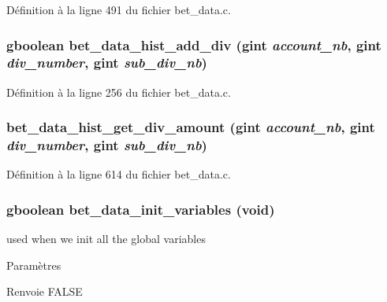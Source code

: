 Définition à la ligne 491 du fichier bet\_\-data.c.

\subsubsection[{bet\_\-data\_\-hist\_\-add\_\-div}]{\setlength{\rightskip}{0pt plus 5cm}gboolean bet\_\-data\_\-hist\_\-add\_\-div (gint {\em account\_\-nb}, \/  gint {\em div\_\-number}, \/  gint {\em sub\_\-div\_\-nb})}\label{bet__data_8h_a8e4e124545cf8a530c9c3ad879bcf5ea}


Définition à la ligne 256 du fichier bet\_\-data.c.

\subsubsection[{bet\_\-data\_\-hist\_\-get\_\-div\_\-amount}]{ bet\_\-data\_\-hist\_\-get\_\-div\_\-amount (gint {\em account\_\-nb}, \/  gint {\em div\_\-number}, \/  gint {\em sub\_\-div\_\-nb})}\label{bet__data_8h_aa0afee08549af46994f0cd802d462338}


Définition à la ligne 614 du fichier bet\_\-data.c.

\subsubsection[{bet\_\-data\_\-init\_\-variables}]{\setlength{\rightskip}{0pt plus 5cm}gboolean bet\_\-data\_\-init\_\-variables (void)}\label{bet__data_8h_ac36863d207e1ef101c501a31760e67a1}
used when we init all the global variables


\begin{DoxyParams}{Paramètres}
\item[{\em }]\end{DoxyParams}
\begin{DoxyReturn}{Renvoie}
FALSE 
\end{DoxyReturn}


